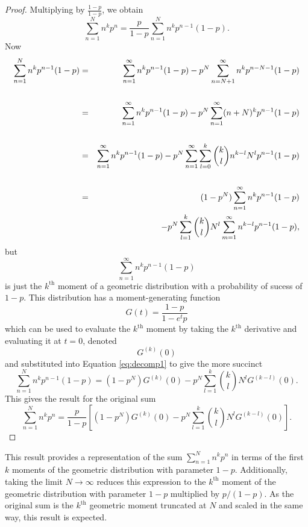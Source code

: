 \documentclass[letterpaper,12pt,oneside,final]{article}
\begin{document}
\begin{proof}
Multiplying by $\frac{1 - p}{1 - p}$, we obtain
$$\sum_{n = 1}^{N} n^k p^n = \frac{p}{1 - p} \sum_{n = 1}^{N} n^k p^{n-1} (1 - p).$$
Now
\begin{eqnarray}
    \sum_{n = 1}^{N} n^k p^{n-1} (1 - p) & = & \sum_{n = 1}^{\infty} n^k p^{n-1} (1 - p) - p^{N} \sum_{n = N + 1}^{\infty} n^k p^{n - N - 1} (1 - p) \nonumber \\
    & & \nonumber \\
    & = & \sum_{n = 1}^{\infty} n^k p^{n-1} (1 - p) - p^{N} \sum_{n = 1}^{\infty} (n + N)^k p^{n - 1} (1 - p) \nonumber \\
    & & \nonumber \\
    & = & \sum_{n = 1}^{\infty} n^k p^{n-1} (1 - p) - p^{N} \sum_{n = 1}^{\infty} \sum_{l = 0}^k {k \choose l} n^{k-l} N^l p^{n - 1} (1 - p) \nonumber \\
    & & \nonumber \\
    & = & (1 - p^N) \sum_{n = 1}^{\infty} n^k p^{n-1} (1 - p) \nonumber \\
    & & \hspace{0.5cm}- p^{N} \sum_{l = 1}^k {k \choose l} N^l \sum_{m = 1}^{\infty}  n^{k-l} p^{n - 1} (1 - p),  \label{eq:decomp1}
\end{eqnarray}
but
$$\sum_{n = 1}^{\infty} n^k p^{n-1} (1 - p)$$
is just the $k^{\text{th}}$ moment of a geometric distribution with a probability of sucess of $1 - p$. This distribution has a moment-generating function
\begin{equation} \label{eq:geoMGF}
G(t) = \frac{1 - p}{1 - e^t p}
\end{equation}
which can be used to evaluate the $k^{\text{th}}$ moment by taking the $k^{\text{th}}$ derivative and evaluating it at $t = 0$, denoted
\begin{equation*} 
G^{(k)}(0)
\end{equation*}
and substituted into Equation \ref{eq:decomp1} to give the more succinct
\begin{equation} \label{eq:sumByMoments}
  \sum_{n = 1}^{N} n^k p^{n-1} (1 - p) = (1 - p^N) G^{(k)}(0) - p^{N} \sum_{l = 1}^k {k \choose l} N^l G^{(k-l)}(0).
\end{equation}
This gives the result for the original sum
\begin{equation} \label{eq:kfirstmoments}
 \sum_{n = 1}^{N} n^k p^n = \frac{p}{1 - p} \left [ (1 - p^N) G^{(k)}(0) - p^{N} \sum_{l = 1}^k {k \choose l} N^l G^{(k-l)}(0) \right ].
\end{equation}
\end{proof}
This result provides a representation of the sum $\sum_{n = 1}^{N} n^k p^n$ in terms of the first $k$ moments of the geometric distribution with parameter $1 - p$. Additionally, taking the limit $N \rightarrow \infty$ reduces this expression to the $k^{\text{th}}$ moment of the geometric distribution with parameter $1 - p$ multiplied by $p/(1 - p)$. As the original sum is the $k^{\text{th}}$ geometric moment truncated at $N$ and scaled in the same way, this result is expected.
\end{document}
